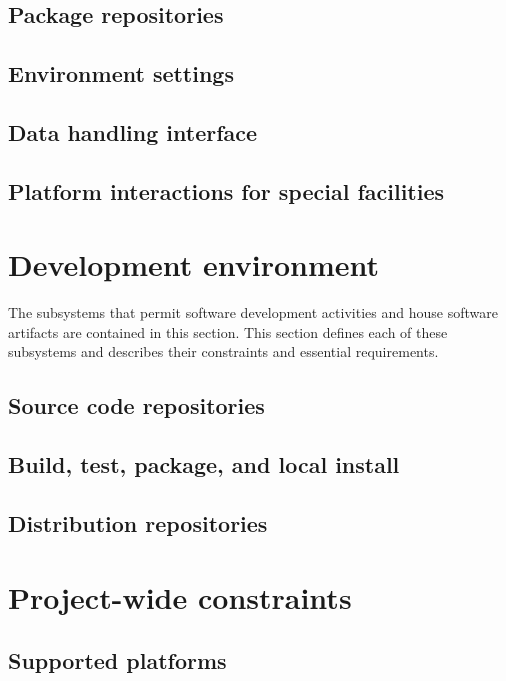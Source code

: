 \documentclass[draftmode,draftwater]{memarticle}
\begin{document}
\subsection{Package repositories}

\subsection{Environment settings}

\subsection{Data handling interface}

\subsection{Platform interactions for special facilities}

\section{Development environment}

The subsystems that permit software development activities and house
software artifacts are contained in this section. This section defines
each of these subsystems and describes their constraints and essential
requirements.


\subsection{Source code repositories}

\subsection{Build, test, package, and local install}


\subsection{Distribution repositories}


\section{Project-wide constraints}

\subsection{Supported platforms}
\end{document}
